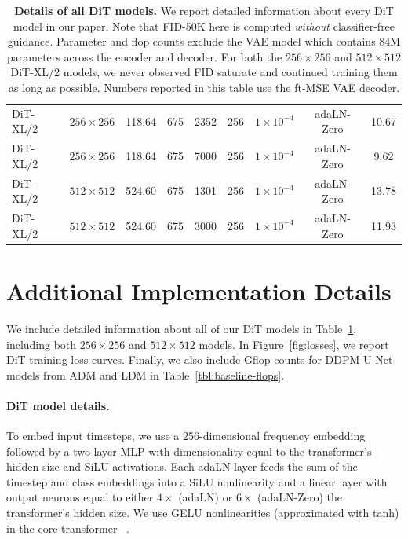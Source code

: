 \documentclass[10pt,twocolumn,letterpaper]{article}
\begin{document}
\begin{table}
{\begin{tabular}{l c c c c c c c c}
DiT-XL/2 &    $256\times256$  &      118.64     &   675  &  2352&  256 & $1 \times 10^{-4}$ & adaLN-Zero & 10.67 \\
DiT-XL/2 &    $256\times256$  &      118.64     &   675  &  7000&  256 & $1 \times 10^{-4}$ & adaLN-Zero & 9.62 \\
\midrule
DiT-XL/2 &    $512\times512$  &      524.60     &   675  &  1301&  256 & $1 \times 10^{-4}$ & adaLN-Zero & 13.78 \\
DiT-XL/2 &    $512\times512$  &      524.60     &   675  &  3000&  256 & $1 \times 10^{-4}$ & adaLN-Zero & 11.93 \\
\bottomrule
\end{tabular}}
\caption{\textbf{Details of all DiT models.} We report detailed information about every DiT model in our paper. Note that FID-50K here is computed \textit{without} classifier-free guidance. Parameter and flop counts exclude the VAE model which contains 84M parameters across the encoder and decoder. For both the $256\times256$ and $512\times512$ DiT-XL/2 models, we never observed FID saturate and continued training them as long as possible. Numbers reported in this table use the ft-MSE VAE decoder.}
\label{tbl:model_stats}
\end{table}

\section{Additional Implementation Details}
We include detailed information about all of our DiT models in Table~\ref{tbl:model_stats}, including both $256\times256$ and $512\times512$ models. In Figure~\ref{fig:losses}, we report DiT training loss curves. Finally, we also include Gflop counts for DDPM U-Net models from ADM and LDM in Table~\ref{tbl:baseline-flops}.
\vspace{-3mm}
\paragraph{DiT model details.} To embed input timesteps, we use a 256-dimensional frequency embedding~\cite{dhariwal2021adm} followed by a two-layer MLP with dimensionality equal to the transformer's hidden size and SiLU activations. Each adaLN layer feeds the sum of the timestep and class embeddings into a SiLU nonlinearity and a linear layer with output neurons equal to either $4\times$ (adaLN) or $6\times$ (adaLN-Zero) the transformer's hidden size. We use GELU nonlinearities (approximated with tanh) in the core transformer ~\cite{hendrycks2016gaussian}.
\vspace{-3mm}
\end{document}
